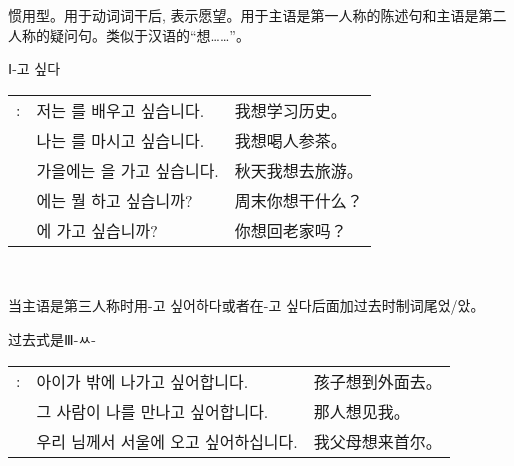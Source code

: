 \begin{grammar}
\begin{grammarsect}[\kr -고 싶다]
\begin{itemize}
            \item 惯用型。用于动词词干后, 表示愿望。用于主语是第一人称的陈述句和主语是第二人称的疑问句。类似于汉语的“想……”。
            {\color{gray} \item Ⅰ{\kr -고 싶다} }
        \end{itemize}
        \begin{tabular}{lll}
            \kr \ruby{例}{예}: &\kr 저는 \ruby{歷史}{역사}를 배우고 싶습니다.&我想学习历史。\\
            &\kr 나는 \ruby{人蔘茶}{인삼차}를 마시고 싶습니다.&我想喝人参茶。\\
            &\kr 가을에는 \ruby{旅行}{여행}을 가고 싶습니다.&秋天我想去旅游。\\
            &\kr \ruby{週末}{주말}에는 뭘 하고 싶습니까?&周末你想干什么？\\
            &\kr \ruby{故鄉}{고향}에 가고 싶습니까?&你想回老家吗？
        \end{tabular}\\
        \begin{itemize}
            \item 当主语是第三人称时用{\kr -고 싶어하다}或者在{\kr -고 싶다}后面加过去时制词尾{\kr 었/았}。
            {\color{gray} \item 过去式是Ⅲ-ㅆ-} 
        \end{itemize}
        \begin{tabular}{lll}
            \kr \ruby{例}{예}: &\kr 아이가 밖에 나가고 싶어합니다. &孩子想到外面去。\\
            &\kr 그 사람이 나를 만나고 싶어합니다. &那人想见我。\\
            &\kr 우리 \ruby{父母}{부모}님께서 서울에 오고 싶어하십니다.&我父母想来首尔。
        \end{tabular}\\
    \end{grammarsect}
\end{grammar}
